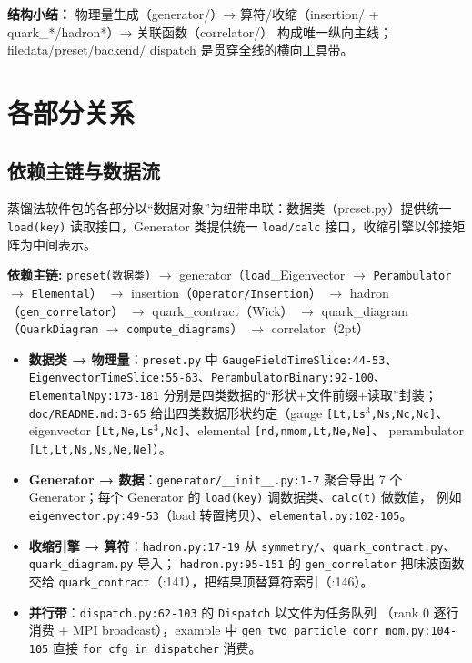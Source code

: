 \documentclass[UTF8]{ctexart}
\begin{document}
\begin{keybox}
\textbf{结构小结：} \textcolor{struct}{物理量生成（generator/）→ 算符/收缩（insertion/
+ quark\_*/hadron*）→ 关联函数（correlator/）} 构成唯一纵向主线；filedata/preset/backend/
dispatch 是贯穿全线的横向工具带。
\end{keybox}

\section{各部分关系}

\subsection{依赖主链与数据流}
蒸馏法软件包的各部分以``数据对象''为纽带串联：数据类（preset.py）提供统一 \texttt{load(key)}
读取接口，Generator 类提供统一 \texttt{load/calc} 接口，收缩引擎以邻接矩阵为中间表示。

\begin{keybox}
\textbf{依赖主链:} \textcolor{relation}{\texttt{preset(数据类)} $\to$ generator（\texttt{load}\_\allowbreak Eigenvector $\to$ \texttt{Perambulator} $\to$ \texttt{Elemental}） $\to$ insertion（\texttt{Operator/Insertion}） $\to$ hadron（\texttt{gen\_correlator}） $\to$ quark\_contract（Wick） $\to$ quark\_diagram（\texttt{QuarkDiagram} $\to$ \texttt{compute\_diagrams}） $\to$ correlator（2pt）}
\end{keybox}

\begin{itemize}
\item \textbf{数据类 → 物理量}：\texttt{preset.py} 中 \texttt{GaugeFieldTimeSlice:44-53}、
\texttt{EigenvectorTimeSlice:55-63}、\texttt{PerambulatorBinary:92-100}、
\texttt{ElementalNpy:173-181} 分别是四类数据的``形状+文件前缀+读取''封装；
\texttt{doc/README.md:3-65} 给出四类数据形状约定（gauge \texttt{[Lt,Ls$^3$,Ns,Nc,Nc]}、
eigenvector \texttt{[Lt,Ne,Ls$^3$,Nc]}、elemental \texttt{[nd,nmom,Lt,Ne,Ne]}、
perambulator \texttt{[Lt,Lt,Ns,Ns,Ne,Ne]}）。
\item \textbf{Generator → 数据}：\texttt{generator/\_\_init\_\_.py:1-7} 聚合导出 7 个
Generator；每个 Generator 的 \texttt{load(key)} 调数据类、\texttt{calc(t)} 做数值，
例如 \texttt{eigenvector.py:49-53}（load 转置拷贝）、\texttt{elemental.py:102-105}。
\item \textbf{收缩引擎 → 算符}：\texttt{hadron.py:17-19} 从
\texttt{symmetry/}、\texttt{quark\_contract.py}、\texttt{quark\_diagram.py} 导入；
\texttt{hadron.py:95-151} 的 \texttt{gen\_correlator} 把味波函数交给
\texttt{quark\_contract}（:141），把结果顶替算符索引（:146）。
\item \textbf{并行带}：\texttt{dispatch.py:62-103} 的 \texttt{Dispatch} 以文件为任务队列
（rank 0 逐行消费 + MPI broadcast），example 中 \texttt{gen\_two\_particle\_corr\_mom.py:104-105}
直接 \texttt{for cfg in dispatcher} 消费。
\end{itemize}
\end{document}
